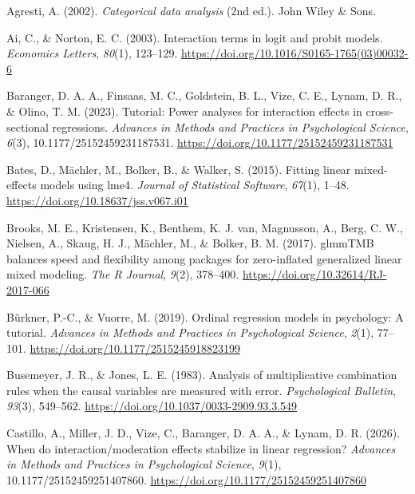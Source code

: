 \documentclass[
  man,
  floatsintext,
  longtable,
  nolmodern,
  notxfonts,
  notimes,
  colorlinks=true,linkcolor=blue,citecolor=blue,urlcolor=blue]{apa7}
\newlength{\cslhangindent}
\newenvironment{CSLReferences}[2] %
 {\begin{list}{}{%
  \setlength{\itemindent}{0pt}
  \setlength{\leftmargin}{0pt}
  \setlength{\parsep}{0pt}
  \ifodd #1
   \setlength{\leftmargin}{\cslhangindent}
   \setlength{\itemindent}{-1\cslhangindent}
  \fi
  \setlength{\itemsep}{#2\baselineskip}}}
 {\end{list}}
\begin{document}
\protect{}\label{refs}
\begin{CSLReferences}{1}{0}
Agresti, A. (2002). \emph{Categorical data analysis} (2nd ed.). John
Wiley \& Sons.

Ai, C., \& Norton, E. C. (2003). Interaction terms in logit and probit
models. \emph{Economics Letters}, \emph{80}(1), 123--129.
\url{https://doi.org/10.1016/S0165-1765(03)00032-6}

Baranger, D. A. A., Finsaas, M. C., Goldstein, B. L., Vize, C. E.,
Lynam, D. R., \& Olino, T. M. (2023). Tutorial: Power analyses for
interaction effects in cross-sectional regressions. \emph{Advances in
Methods and Practices in Psychological Science}, \emph{6}(3),
10.1177/25152459231187531.
\url{https://doi.org/10.1177/25152459231187531}

Bates, D., Mächler, M., Bolker, B., \& Walker, S. (2015). Fitting linear
mixed-effects models using {lme4}. \emph{Journal of Statistical
Software}, \emph{67}(1), 1--48.
\url{https://doi.org/10.18637/jss.v067.i01}

Brooks, M. E., Kristensen, K., Benthem, K. J. van, Magnusson, A., Berg,
C. W., Nielsen, A., Skaug, H. J., Mächler, M., \& Bolker, B. M. (2017).
{glmmTMB} balances speed and flexibility among packages for
zero-inflated generalized linear mixed modeling. \emph{The R Journal},
\emph{9}(2), 378--400. \url{https://doi.org/10.32614/RJ-2017-066}

Bürkner, P.-C., \& Vuorre, M. (2019). Ordinal regression models in
psychology: A tutorial. \emph{Advances in Methods and Practices in
Psychological Science}, \emph{2}(1), 77--101.
\url{https://doi.org/10.1177/2515245918823199}

Busemeyer, J. R., \& Jones, L. E. (1983). Analysis of multiplicative
combination rules when the causal variables are measured with error.
\emph{Psychological Bulletin}, \emph{93}(3), 549--562.
\url{https://doi.org/10.1037/0033-2909.93.3.549}

Castillo, A., Miller, J. D., Vize, C., Baranger, D. A. A., \& Lynam, D.
R. (2026). When do interaction/moderation effects stabilize in linear
regression? \emph{Advances in Methods and Practices in Psychological
Science}, \emph{9}(1), 10.1177/25152459251407860.
\url{https://doi.org/10.1177/25152459251407860}


\end{CSLReferences}
\end{document}
